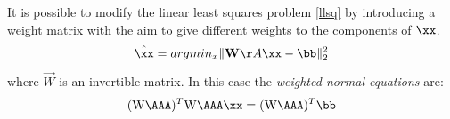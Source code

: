 It is possible to modify the linear least squares problem \eqref{llsq}  by introducing a weight matrix with the aim to give different weights to the components of $\xx$. 
\begin{equation}
   \hat{\xx}= argmin_x \|\vec{W} \AA \xx-\bb\|_2^2
   \label{wllsq}
\end{equation}
where $\vec{W}$ is an invertible matrix. In this case the \textit{weighted normal equations} are:
$$(\mat{W}\AAA)^T\mat{W}\AAA \xx=(\mat{W}\AAA)^T \bb$$


